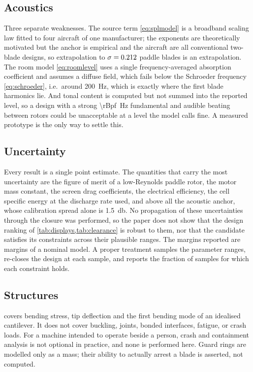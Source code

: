 \subsection{Acoustics}

Three separate weaknesses. The source term \cref{eq:splmodel} is a broadband
scaling law fitted to four aircraft of one manufacturer; the exponents are
theoretically motivated but the anchor is empirical and the aircraft are all
conventional two-blade designs, so extrapolation to $\sigma=0.212$
paddle blades is an extrapolation. The room model \cref{eq:roomlevel} uses a
single frequency-averaged absorption coefficient and assumes a diffuse field,
which fails below the Schroeder frequency \cref{eq:schroeder}, i.e.\ around
\SI{200}{\hertz}, which is exactly where the first blade harmonics lie. And
tonal content is computed but not summed into the reported level, so a design
with a strong \SI{\rBpf}{\hertz} fundamental and audible beating between rotors
could be unacceptable at a level the model calls fine. A measured prototype is
the only way to settle this.

\subsection{Uncertainty}

Every result is a single point estimate. The quantities that carry the most
uncertainty are the figure of merit of a low-Reynolds paddle rotor, the motor
mass constant, the screen drag coefficients, the electrical efficiency, the
cell specific energy at the discharge rate used, and above all the acoustic
anchor, whose calibration spread alone is \SI{1.5}{\decibel}. No propagation
of these uncertainties through the closure was performed, so the paper does
not show that the design ranking of \cref{tab:displays,tab:clearance} is
robust to them, nor that the candidate satisfies its constraints across their
plausible ranges. The margins reported are margins of a nominal model. A
proper treatment samples the parameter ranges, re-closes the design at each
sample, and reports the fraction of samples for which each constraint holds.

\subsection{Structures}

 covers bending stress, tip deflection and the first bending
mode of an idealised cantilever. It does not cover buckling, joints, bonded
interfaces, fatigue, or crash loads. For a machine intended to operate beside a
person, crash and containment analysis is not optional in practice, and none is
performed here. Guard rings are modelled only as a mass; their ability to
actually arrest a blade is asserted, not computed.

